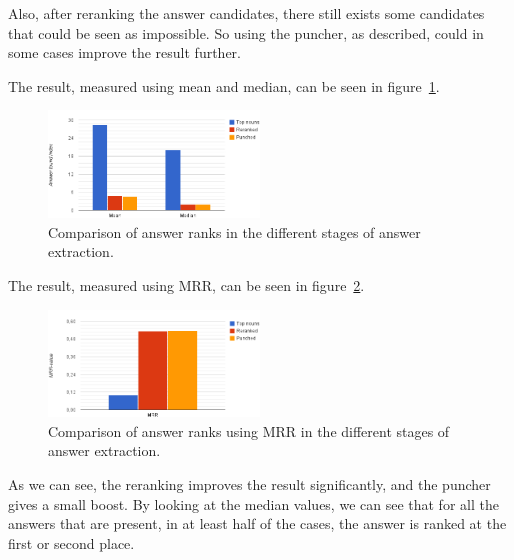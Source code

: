 Also, after reranking the answer candidates, there still exists some candidates that could be seen as impossible.
So using the puncher, as described, could in some cases improve the result further.

The result, measured using mean and median, can be seen in figure~\ref{fig:meanmedian}.

\begin{figure}[h!]
  \centering
  \hspace*{-0.6cm}
  \includegraphics[width=0.5\textwidth]{figures/meanMedian.png}
  \caption{Comparison of answer ranks in the different stages of answer extraction.}
  \label{fig:meanmedian}
\end{figure}

The result, measured using MRR, can be seen in figure~\ref{fig:mrr}.
\begin{figure}[h!]
  \centering
  \hspace*{-0.6cm}
  \includegraphics[width=0.5\textwidth]{figures/mrr.png}
  \caption{Comparison of answer ranks using MRR in the different stages of answer extraction.}
  \label{fig:mrr}
\end{figure}

As we can see, the reranking improves the result significantly, and the puncher gives a small boost.
By looking at the median values, we can see that for all the answers that are present, 
in at least half of the cases, the answer is ranked at the first or second place.
